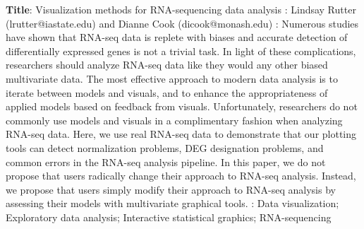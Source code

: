 \documentclass[12pt]{article}
\begin{document}
\noindent
\textbf{Title}: \break
Visualization methods for RNA-sequencing data analysis
\vspace{5mm} \break
{}: \break
Lindsay Rutter (lrutter@iastate.edu) and Dianne Cook (dicook@monash.edu)
\vspace{5mm} \break
{}: \break
Numerous studies have shown that RNA-seq data is replete with biases and accurate detection of differentially expressed genes is not a trivial task. In light of these complications, researchers should analyze RNA-seq data like they would any other biased multivariate data. The most effective approach to modern data analysis is to iterate between models and visuals, and to enhance the appropriateness of applied models based on feedback from visuals. Unfortunately, researchers do not commonly use models and visuals in a complimentary fashion when analyzing RNA-seq data. Here, we use real RNA-seq data to demonstrate that our plotting tools can detect normalization problems, DEG designation problems, and common errors in the RNA-seq analysis pipeline. In this paper, we do not propose that users radically change their approach to RNA-seq analysis. Instead, we propose that users simply modify their approach to RNA-seq analysis by assessing their models with multivariate graphical tools.
\vspace{5mm} \break
{}: \break
Data visualization; Exploratory data analysis; Interactive statistical graphics; RNA-sequencing
\end{document}
